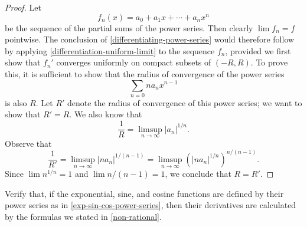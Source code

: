 \begin{proof}
	Let 
	\[ f_n(x) = a_0 + a_1 x + \dotsb + a_n x^n \]
	be the sequence of the partial sums of the power series. Then clearly $\lim f_n = f$ pointwise. The conclusion of \cref{differentiating-power-series} would therefore follow by applying \cref{differentiation-uniform-limit} to the sequence $f_n$, provided we first show that $f_n'$ converges uniformly on compact subsets of $(-R, R)$. To prove this, it is sufficient to show that the radius of convergence of the power series 
	\[ \sum_{n = 0} na_n x^{n-1} \]
	is also $R$. Let $R'$ denote the radius of convergence of this power series; we want to show that $R' = R$. We also know that
	\[ \frac{1}{R} = \limsup_{n \to \infty} |a_n|^{1/n}.  \] 
	Observe that
	\[ \frac{1}{R'} = \limsup_{n \to \infty} |na_n|^{1/(n-1)} = \limsup_{n \to \infty} (|na_n|^{1/n})^{n/(n-1)}. \]
	Since $\lim n^{1/n} = 1$ and $\lim n/(n-1) = 1$, we conclude that $R = R'$. 
\end{proof}

\begin{exercise}
	Verify that, if the exponential, sine, and cosine functions are defined by their power series as in \cref{exp-sin-cos-power-series}, then their derivatives are calculated by the formulas we stated in \cref{non-rational}. 
\end{exercise}

